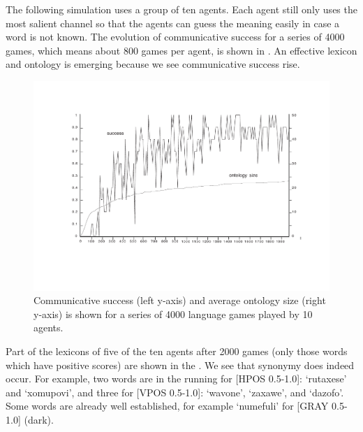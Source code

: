 The following simulation uses a group of ten agents. 
Each agent still only uses the most salient channel so that 
the agents can guess the meaning easily in case a word is not known. 
The evolution of communicative success for a series of 
4000 games, which means about 800 games per agent, 
is shown in . 
An effective lexicon and ontology is 
emerging because we see communicative success rise. 


\begin{figure}[htbp]
  \centerline{\includegraphics[width=.70\textwidth]{chap6/figs/gsucc2}}
\caption{\label{gsucc2} Communicative 
success (left y-axis) and average ontology size 
(right y-axis) is shown for a series of 4000
language games played by 10 agents.} 
\end{figure}

Part of the lexicons of five of the ten agents after 2000 games 
(only those words which have positive scores) are shown in the 
. We see that synonymy does indeed occur. For
example, two words are in the 
running for [HPOS 0.5-1.0]: `rutaxese' and `xomupovi', and 
three for [VPOS 0.5-1.0]: `wavone', `zaxawe', and 
`dazofo'. Some words are already well established, for
example `numefuli' for [GRAY 0.5-1.0] (dark). 


